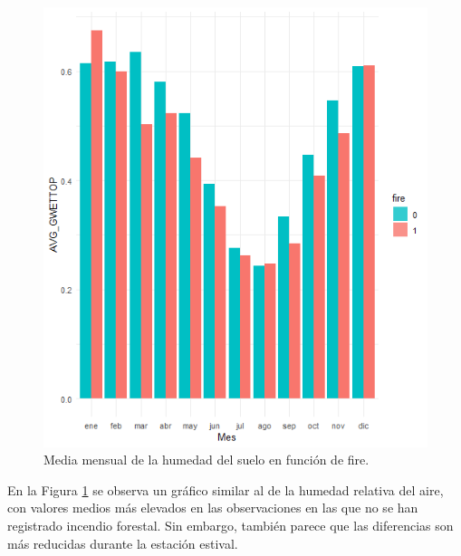 \documentclass[12pt,a4paper,]{book}
\numberwithin{dummy}{section}
\theoremstyle{ocrenumbox}
\theoremstyle{blacknumex}
\theoremstyle{blacknumbox}
\theoremstyle{ocrenum}
\theoremstyle{ocrenum}
\begin{document}
\begin{figure}[h]
\centering
\includegraphics[width =\textwidth]{graficos/GWETTOP_mes.png}
\caption{Media mensual de la humedad del suelo en función de fire.}
\label{fig:GWETTOP_mes}
\end{figure}

En la Figura \ref{fig:GWETTOP_mes} se observa un gráfico similar al de
la humedad relativa del aire, con valores medios más elevados en las
observaciones en las que no se han registrado incendio forestal. Sin
embargo, también parece que las diferencias son más reducidas durante la
estación estival.
\end{document}
